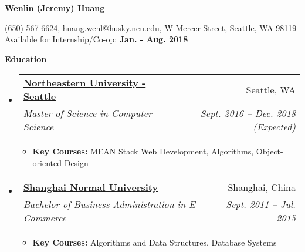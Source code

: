 \documentclass[letterpaper,11pt]{article}
\makeatletter
\newcommand{\resitem}[1]{\item #1 \vspace{-2pt}}
\newcommand{\resheading}[1]{{\large \colorbox{mygrey}{\begin{minipage}{\textwidth}{\textbf{#1 \vphantom{p\^{E}}}}\end{minipage}}}}
\newcommand{\ressubheading}[4]{
\begin{tabular*}{6.5in}{l@{\extracolsep{\fill}}r}
    \textbf{#1} & #2 \\
    \textit{#3} & \textit{#4} \\
\end{tabular*}\vspace{-6pt}}
\makeatother
\begin{document}
    \centering\textbf{\huge Wenlin (Jeremy) Huang}\\ \vspace{0.1in}

    (650) 567-6624, \href{mailto:huang.wenl@husky.neu.edu}{huang.wenl@husky.neu.edu}, {W Mercer Street, Seattle, WA 98119} \\

    {Available for Internship/Co-op: \textbf{\underline{Jan. - Aug. 2018}}}


    \resheading{Education}
    \begin{itemize}
        \item[]
        \ressubheading{\href{http://www.northeastern.edu/seattle/}{Northeastern University - Seattle}}{Seattle, WA}{Master of Science in Computer Science} {Sept. 2016 -- Dec. 2018 (Expected)}
        { \footnotesize
        \begin{itemize}
            \resitem{\textbf{Key Courses: }MEAN Stack Web Development, Algorithms, Object-oriented Design}

        \end{itemize}
        }

        \item[]
        \ressubheading{\href{http://www.shnu.edu.cn/}{Shanghai Normal University}}{Shanghai, China}
        {Bachelor of Business Administration in E-Commerce}{Sept. 2011 -- Jul. 2015}
        { \footnotesize
        \begin{itemize}
            \resitem{\textbf{Key Courses: }Algorithms and Data Structures, Database Systems}

        \end{itemize}
        }
    \end{itemize} %

\end{document}
